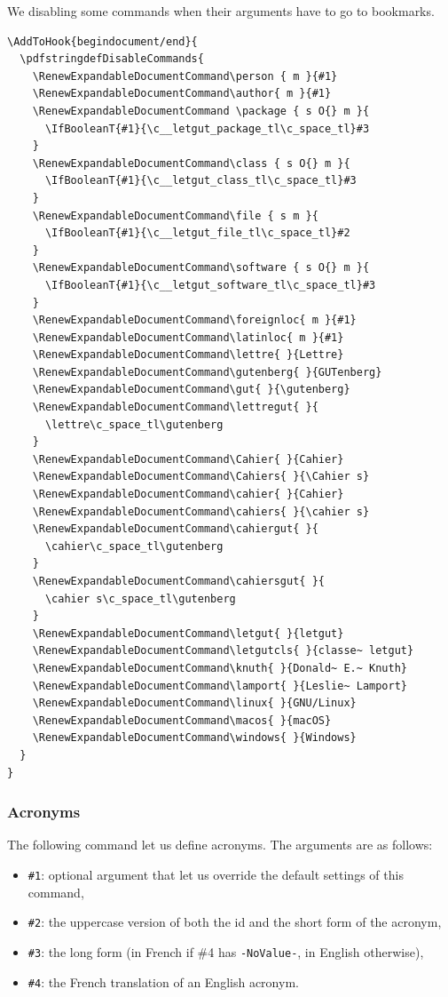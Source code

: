 \documentclass{letgut}
\begin{document}
We disabling some commands when their arguments have to go to bookmarks.

\begin{lstlisting}
\AddToHook{begindocument/end}{
  \pdfstringdefDisableCommands{
    \RenewExpandableDocumentCommand\person { m }{#1}
    \RenewExpandableDocumentCommand\author{ m }{#1}
    \RenewExpandableDocumentCommand \package { s O{} m }{
      \IfBooleanT{#1}{\c__letgut_package_tl\c_space_tl}#3
    }
    \RenewExpandableDocumentCommand\class { s O{} m }{
      \IfBooleanT{#1}{\c__letgut_class_tl\c_space_tl}#3
    }
    \RenewExpandableDocumentCommand\file { s m }{
      \IfBooleanT{#1}{\c__letgut_file_tl\c_space_tl}#2
    }
    \RenewExpandableDocumentCommand\software { s O{} m }{
      \IfBooleanT{#1}{\c__letgut_software_tl\c_space_tl}#3
    }
    \RenewExpandableDocumentCommand\foreignloc{ m }{#1}
    \RenewExpandableDocumentCommand\latinloc{ m }{#1}
    \RenewExpandableDocumentCommand\lettre{ }{Lettre}
    \RenewExpandableDocumentCommand\gutenberg{ }{GUTenberg}
    \RenewExpandableDocumentCommand\gut{ }{\gutenberg}
    \RenewExpandableDocumentCommand\lettregut{ }{
      \lettre\c_space_tl\gutenberg
    }
    \RenewExpandableDocumentCommand\Cahier{ }{Cahier}
    \RenewExpandableDocumentCommand\Cahiers{ }{\Cahier s}
    \RenewExpandableDocumentCommand\cahier{ }{Cahier}
    \RenewExpandableDocumentCommand\cahiers{ }{\cahier s}
    \RenewExpandableDocumentCommand\cahiergut{ }{
      \cahier\c_space_tl\gutenberg
    }
    \RenewExpandableDocumentCommand\cahiersgut{ }{
      \cahier s\c_space_tl\gutenberg
    }
    \RenewExpandableDocumentCommand\letgut{ }{letgut}
    \RenewExpandableDocumentCommand\letgutcls{ }{classe~ letgut}
    \RenewExpandableDocumentCommand\knuth{ }{Donald~ E.~ Knuth}
    \RenewExpandableDocumentCommand\lamport{ }{Leslie~ Lamport}
    \RenewExpandableDocumentCommand\linux{ }{GNU/Linux}
    \RenewExpandableDocumentCommand\macos{ }{macOS}
    \RenewExpandableDocumentCommand\windows{ }{Windows}
  }
}
\end{lstlisting}

\subsubsection{Acronyms}
\label{sec:orgd329484}

The following command let us define acronyms. The arguments are as follows:
\begin{itemize}
\item \lstinline+#1+: optional argument that let us override the default settings of this
command,
\item \lstinline+#2+: the uppercase version of both the id and the short form of the acronym,
\item \lstinline+#3+: the long form (in French if \#4 has \lstinline+-NoValue-+, in English otherwise),
\item \lstinline+#4+: the French translation of an English acronym.
\end{itemize}
\end{document}
